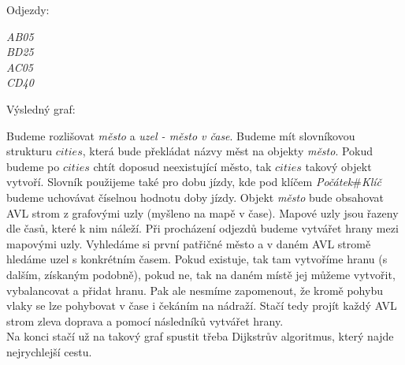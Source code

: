 \documentclass[a4paper]{article}
\begin{document}
Odjezdy:
\begin{center}
	\textit{A\hspace{1cm}B\hspace{1cm}05} \\
	\textit{B\hspace{1cm}D\hspace{1cm}25} \\
	\textit{A\hspace{1cm}C\hspace{1cm}05} \\
	\textit{C\hspace{1cm}D\hspace{1cm}40} \\
\end{center}


Výsledný graf:
\begin{center}
\end{center}

Budeme rozlišovat \textit{město} a \textit{uzel - město v čase}. Budeme mít slovníkovou strukturu $cities$, která bude překládat názvy měst na objekty \textit{město}. Pokud budeme po $cities$ chtít doposud neexistující město, tak $cities$ takový objekt vytvoří. Slovník použijeme také pro dobu jízdy, kde pod klíčem \textit{Počátek}\#\textit{Klíč} budeme uchovávat číselnou hodnotu doby jízdy. Objekt \textit{město} bude obsahovat AVL strom z grafovými uzly (myšleno na mapě v čase). Mapové uzly jsou řazeny dle časů, které k nim náleží. Při procházení odjezdů budeme vytvářet hrany mezi mapovými uzly. Vyhledáme si první patřičné město a v daném AVL stromě hledáme uzel s konkrétním časem. Pokud existuje, tak tam vytvoříme hranu (s dalším, získaným podobně), pokud ne, tak na daném místě jej můžeme vytvořit, vybalancovat a přidat hranu. Pak ale nesmíme zapomenout, že kromě pohybu vlaky se lze pohybovat v čase i čekáním na nádraží. Stačí tedy projít každý AVL strom zleva doprava a pomocí následníků vytvářet hrany.
\\
Na konci stačí už na takový graf spustit třeba Dijkstrův algoritmus, který najde nejrychlejší cestu.
\pagebreak
\end{document}
